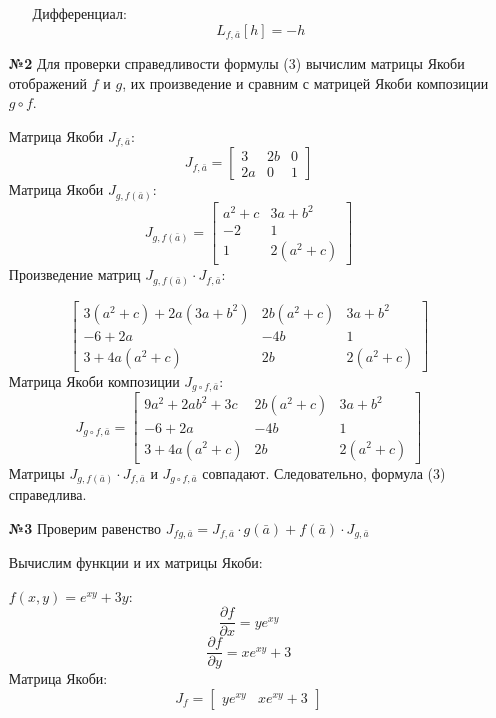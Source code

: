 \documentclass[a4paper]{article}
\begin{document}
\begin{enumerate}
\begin{enumerate}
        Дифференциал:
        \[
        L_{f, \bar{a}}[h] = -h
        \]
        
    \end{enumerate}

    \item[\textbf{№2}]Для проверки справедливости формулы (3) вычислим матрицы Якоби отображений \( f \) и \( g \), их произведение и сравним с матрицей Якоби композиции \( g \circ f \).

    Матрица Якоби \( J_{f, \bar{a}} \):
    \[
    J_{f, \bar{a}} = 
    \begin{bmatrix}
    3 & 2b & 0 \\
    2a & 0 & 1
    \end{bmatrix}
    \]
    Матрица Якоби \( J_{g, f(\bar{a})} \):
    \[
    J_{g, f(\bar{a})} = 
    \begin{bmatrix}
    a^2 + c & 3a + b^2 \\
    -2 & 1 \\
    1 & 2(a^2 + c)
    \end{bmatrix}
    \]
    Произведение матриц \( J_{g, f(\bar{a})} \cdot J_{f, \bar{a}} \):

    \[
    \begin{bmatrix}
    3(a^2 + c) + 2a(3a + b^2) & 2b(a^2 + c) & 3a + b^2 \\
    -6 + 2a & -4b & 1 \\
    3 + 4a(a^2 + c) & 2b & 2(a^2 + c)
    \end{bmatrix}
    \]
    Матрица Якоби композиции \( J_{g \circ f, \bar{a}} \):
    \[
    J_{g \circ f, \bar{a}} = 
    \begin{bmatrix}
    9a^2 + 2ab^2 + 3c & 2b(a^2 + c) & 3a + b^2 \\
    -6 + 2a & -4b & 1 \\
    3 + 4a(a^2 + c) & 2b & 2(a^2 + c)
    \end{bmatrix}
    \]
    Матрицы \( J_{g, f(\bar{a})} \cdot J_{f, \bar{a}} \) и \( J_{g \circ f, \bar{a}} \) совпадают. Следовательно, формула (3) справедлива.

    \item[\textbf{№3}]Проверим равенство \( J_{fg,\bar{a}} = J_{f,\bar{a}} \cdot g(\bar{a}) + f(\bar{a}) \cdot J_{g,\bar{a}} \)

    Вычислим функции и их матрицы Якоби:

    \( f(x,y) = e^{xy} + 3y \):
    \[ \frac{\partial f}{\partial x} = y e^{xy} \]
    \[ \frac{\partial f}{\partial y} = x e^{xy} + 3 \]
    Матрица Якоби: \[ J_f = \begin{bmatrix} y e^{xy} & x e^{xy} + 3 \end{bmatrix} \]


\end{enumerate}
\end{document}
